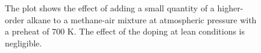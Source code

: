 \begin{figure}

\centering



\caption[- alkane-air flame results - III]{The plot shows the effect of adding a small quantity of a higher-order alkane to a methane-air mixture at atmospheric pressure with a preheat of 700 K. The effect of the doping at lean conditions is negligible.}

\label{fig:c1c2c3}

\end{figure}
